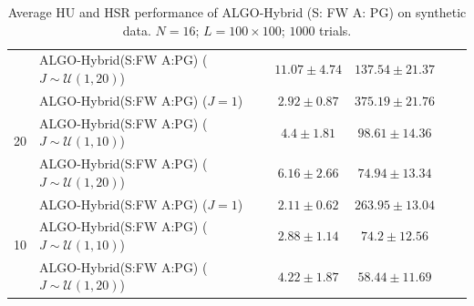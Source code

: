 \begin{table}[h]
\begin{adjustbox}{max width=\textwidth}
\begin{tabular}{|c|l|c|c|c|c|}
                    & ALGO-Hybrid(S:FW A:PG) ($J\sim\mathcal{U}(1,20)$) & $11.07    \pm 4.74$   & $137.54   \pm 21.37$  \tabularnewline \cline{1-4}
\multirow{3}{*}{20} & ALGO-Hybrid(S:FW A:PG) ($J=1$)                    & $2.92     \pm 0.87$   & $375.19   \pm 21.76$  \tabularnewline
                    & ALGO-Hybrid(S:FW A:PG) ($J\sim\mathcal{U}(1,10)$) & $4.4      \pm 1.81$   & $98.61    \pm 14.36$  \tabularnewline
                    & ALGO-Hybrid(S:FW A:PG) ($J\sim\mathcal{U}(1,20)$) & $6.16     \pm 2.66$   & $74.94    \pm 13.34$  \tabularnewline \cline{1-4}
\multirow{3}{*}{10} & ALGO-Hybrid(S:FW A:PG) ($J=1$)                    & $2.11     \pm 0.62$   & $263.95   \pm 13.04$  \tabularnewline
                    & ALGO-Hybrid(S:FW A:PG) ($J\sim\mathcal{U}(1,10)$) & $2.88     \pm 1.14$   & $74.2     \pm 12.56$  \tabularnewline
                    & ALGO-Hybrid(S:FW A:PG) ($J\sim\mathcal{U}(1,20)$) & $4.22     \pm 1.87$   & $58.44    \pm 11.69$  \tabularnewline \cline{1-4}
\end{tabular}
\end{adjustbox}
\caption{Average HU and HSR performance of ALGO-Hybrid (S: FW A: PG) on synthetic data.
         $N = 16$; $L = 100 \times 100$; $1000$ trials.}
\label{table:results_full_HYBRID_FW_PG_MO16}
\end{table}

\newpage

